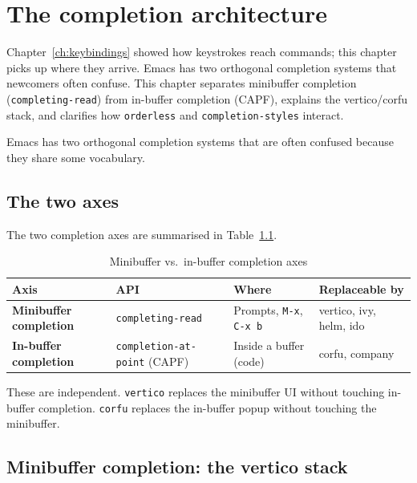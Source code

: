 \chapter{The completion architecture}
\label{ch:completion}
\minitoc\label{the-completion-architecture}

Chapter~\ref{ch:keybindings} showed how keystrokes reach commands;
this chapter picks up where they arrive.  Emacs has two orthogonal
completion systems that newcomers often confuse.  This chapter separates minibuffer completion
(\texttt{completing-read}) from in-buffer completion (CAPF), explains
the vertico/corfu stack, and clarifies how \texttt{orderless}
and \texttt{completion-styles} interact.

Emacs has two orthogonal completion systems that are often confused because they share some vocabulary.

\section{The two axes}\label{the-two-axes}

The two completion axes are summarised in Table~\ref{tab:completion-axes}.

\begin{table}
\centering
\caption{Minibuffer vs.\ in-buffer completion axes}
\label{tab:completion-axes}
\begin{tabularx}{\linewidth}{@{}lllX@{}}
\toprule
Axis & API & Where & Replaceable by \\
\midrule
\textbf{Minibuffer completion} & \texttt{completing-read} & Prompts, \texttt{M-x}, \texttt{C-x b} & vertico, ivy, helm, ido \\
\textbf{In-buffer completion} & \texttt{completion-at-point} (CAPF) & Inside a buffer (code) & corfu, company \\
\bottomrule
\end{tabularx}
\end{table}

These are independent. \texttt{vertico} replaces the minibuffer UI without touching in-buffer completion. \texttt{corfu} replaces the in-buffer popup without touching the minibuffer.

\section{Minibuffer completion: the vertico stack}\label{minibuffer-completion-the-vertico-stack}

